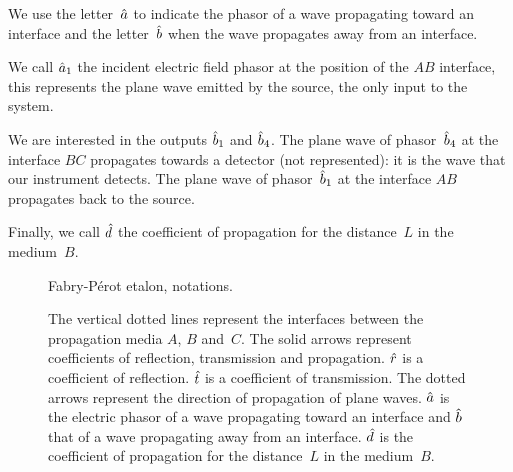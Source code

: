 We use the letter~$\hat{a}$ to indicate the phasor of a wave propagating toward an interface and the letter~$\hat{b}$ when the wave propagates away from an interface.

We call $\hat{a}_1$ the incident electric field phasor at the position of the $AB$ interface,
this represents the plane wave emitted by the source, the only input to the system.

We are interested in the outputs $\hat{b}_1$ and $\hat{b}_4$.
The plane wave of phasor~$\hat{b}_4$ at the interface $BC$ propagates towards a detector (not represented): it is the wave that our instrument detects.
The plane wave of phasor~$\hat{b}_1$ at the interface $AB$ propagates back to the source.

Finally, we call $\hat{d}$ the coefficient of propagation for the distance~$L$ in the medium~$B$.

\begin{figure}
    \centering
    
    \caption{Fabry-Pérot etalon, notations.}
    \caption*{
       The vertical dotted lines represent the interfaces between the propagation media $A$, $B$ and~$C$.
       The solid arrows represent coefficients of reflection, transmission and propagation.
       $\hat{r}$ is a coefficient of reflection.
       $\hat{t}$ is a coefficient of transmission.
       The dotted arrows represent the direction of propagation of plane waves.
       $\hat{a}$ is the electric phasor of a wave propagating toward an interface and
       $\hat{b}$ that of a wave propagating away from an interface.
       $\hat{d}$ is the coefficient of propagation for the distance~$L$ in the medium~$B$.
    }
    \label{fig:cavity_notations}
\end{figure}

